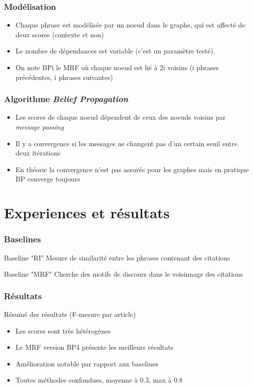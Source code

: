 \documentclass[12pt]{beamer}
\begin{document}
\begin{frame}
  \frametitle{Modélisation}
  \begin{itemize}
   \item Chaque phrase est modélisée par un noeud dans le graphe, qui est affecté de deux scores (contexte et non)
   \item Le nombre de dépendances est variable (c'est un paramètre testé).
   \item On note BPi le MRF où chaque noeud est lié à 2i voisins (i phrases précédentes, i phrases suivantes)
  \end{itemize}
\end{frame}

\begin{frame}
  \frametitle{Algorithme \textit{Belief Propagation}}
  \begin{itemize}
   \item Les scores de chaque noeud dépendent de ceux des noeuds voisins par \textit{message passing}
   \item Il y a convergence si les messages ne changent pas d'un certain seuil entre deux itérations
   \item En théorie la convergence n'est pas assurée pour les graphes mais en pratique BP converge toujours
  \end{itemize}
\end{frame}

\section{Experiences et résultats}
\begin{frame}
  \frametitle{Baselines}
  \begin{block}{Baseline "RI"}
    Mesure de similarité entre les phrases contenant des citations
  \end{block}
  \begin{block}{Baseline "MRF"}
    Cherche des motifs de discours dans le voisinnage des citations 
  \end{block}
\end{frame}

\begin{frame}
  \frametitle{Résultats}
  Résumé des résultats (F-mesure par article)
  \begin{itemize}
   \item Les scores sont très hétérogènes
   \item Le MRF version BP4 présente les meilleurs résultats
   \item Amélioration notable par rapport aux baselines
   \item Toutes méthodes confondues, moyenne à 0.3, max à 0.8
  \end{itemize}


\end{frame}
\end{document}
